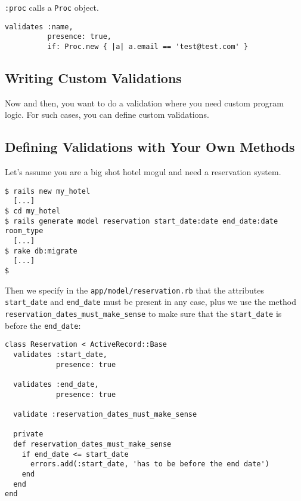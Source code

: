 \documentclass[a4paper]{book}
\begin{document}
\texttt{:}\texttt{proc} calls a \texttt{Proc} object.

\begin{shaded}\begin{verbatim}
validates :name,
          presence: true,
          if: Proc.new { |a| a.email == 'test@test.com' }
\end{verbatim}\end{shaded}

\subsection{Writing Custom Validations}\label{writing-custom-validations}

Now and then, you want to do a validation where you need custom program logic. For such cases, you can define custom validations.

\subsection{Defining Validations with Your Own Methods}\label{defining-validations-with-your-own-methods}

Let's assume you are a big shot hotel mogul and need a reservation system.

\begin{shaded}\begin{verbatim}
$ rails new my_hotel
  [...]
$ cd my_hotel
$ rails generate model reservation start_date:date end_date:date room_type
  [...]
$ rake db:migrate
  [...]
$
\end{verbatim}\end{shaded}

Then we specify in the \texttt{app/model/reservation.rb} that the attributes \texttt{start\_date} and \texttt{end\_date} must be present in any case, plus we use the method \texttt{reservation\_dates\_must\_make\_sense} to make sure that the \texttt{start\_date} is before the \texttt{end\_date}:

\begin{shaded}\begin{verbatim}
class Reservation < ActiveRecord::Base
  validates :start_date,
            presence: true

  validates :end_date,
            presence: true

  validate :reservation_dates_must_make_sense

  private
  def reservation_dates_must_make_sense
    if end_date <= start_date
      errors.add(:start_date, 'has to be before the end date')
    end
  end
end
\end{verbatim}\end{shaded}
\end{document}
